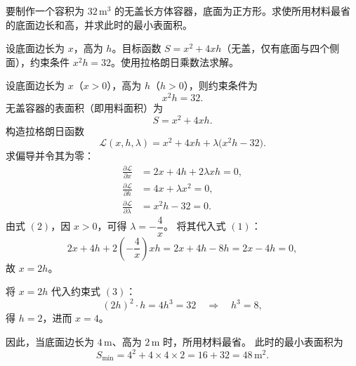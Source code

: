 \documentclass[answer]{THUExam}
\begin{document}
\begin{problem}
要制作一个容积为 $32\,\mathrm{m}^3$ 的无盖长方体容器，底面为正方形。求使所用材料最省的底面边长和高，并求此时的最小表面积。
\end{problem}
\begin{note}
设底面边长为 $x$，高为 $h$。目标函数 $S=x^2+4xh$（无盖，仅有底面与四个侧面），约束条件 $x^2h=32$。使用拉格朗日乘数法求解。
\end{note}
\begin{solution}
设底面边长为 $x$（$x>0$），高为 $h$（$h>0$），则约束条件为
\[
x^2h=32.
\]
无盖容器的表面积（即用料面积）为
\[
S=x^2+4xh.
\]
构造拉格朗日函数
\[
\mathcal{L}(x,h,\lambda)=x^2+4xh+\lambda\bigl(x^2h-32\bigr).
\]
求偏导并令其为零：
\begin{align*}
\frac{\partial\mathcal{L}}{\partial x}&=2x+4h+2\lambda xh=0,\tag{1}\\
\frac{\partial\mathcal{L}}{\partial h}&=4x+\lambda x^2=0,\tag{2}\\
\frac{\partial\mathcal{L}}{\partial\lambda}&=x^2h-32=0.\tag{3}
\end{align*}
由式 $(2)$，因 $x>0$，可得 $\lambda=-\dfrac{4}{x}$。
将其代入式 $(1)$：
\[
2x+4h+2\left(-\frac{4}{x}\right)xh=2x+4h-8h=2x-4h=0,
\]
故 $x=2h$。

将 $x=2h$ 代入约束式 $(3)$：
\[
(2h)^2\cdot h=4h^3=32\quad\Longrightarrow\quad h^3=8,
\]
得 $h=2$，进而 $x=4$。

因此，当底面边长为 $\boxed{4\,\mathrm{m}}$、高为 $\boxed{2\,\mathrm{m}}$ 时，所用材料最省。
此时的最小表面积为
\[
S_{\min}=4^2+4\times4\times2=16+32=\boxed{48\,\mathrm{m}^2}.
\]
\end{solution}

\vspace{1cm}
\end{document}
